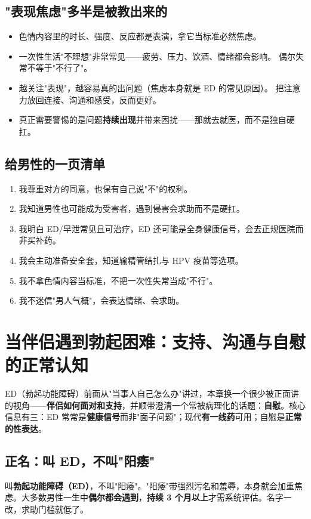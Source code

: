 \documentclass[12pt,UTF8,openany]{ctexbook}
\begin{document}
\section{"表现焦虑"多半是被教出来的}

\begin{itemize}[leftmargin=2em]
  \item 色情内容里的时长、强度、反应都是表演，拿它当标准必然焦虑。
  \item 一次性生活"不理想"非常常见——疲劳、压力、饮酒、情绪都会影响。
        偶尔失常不等于"不行了"。
  \item 越关注"表现"，越容易真的出问题（焦虑本身就是 ED 的常见原因）。
        把注意力放回连接、沟通和感受，反而更好。
  \item 真正需要警惕的是问题\textbf{持续出现}并带来困扰——那就去就医，而不是独自硬扛。
\end{itemize}

\section{给男性的一页清单}

\begin{enumerate}[leftmargin=2em,itemsep=0.3em]
  \item 我尊重对方的同意，也保有自己说"不"的权利。
  \item 我知道男性也可能成为受害者，遇到侵害会求助而不是硬扛。
  \item 我明白 ED/早泄常见且可治疗，ED 还可能是全身健康信号，会去正规医院而非买补药。
  \item 我会主动准备安全套，知道输精管结扎与 HPV 疫苗等选项。
  \item 我不拿色情内容当标准，不把一次性失常当成"不行"。
  \item 我不迷信"男人气概"，会表达情绪、会求助。
\end{enumerate}

\chapter{当伴侣遇到勃起困难：支持、沟通与自慰的正常认知}
\label{chap:partner-ed}

ED（勃起功能障碍）前面从"当事人自己怎么办"讲过，本章换一个很少被正面讲的视角——\textbf{伴侣如何面对和支持}，并顺带澄清一个常被病理化的话题：\textbf{自慰}。核心信息有三：ED 常常是\textbf{健康信号}而非"面子问题"；现代\textbf{有一线药}可用；自慰是\textbf{正常的性表达}。

\section{正名：叫 ED，不叫"阳痿"}
叫\textbf{勃起功能障碍（ED）}，不叫"阳痿"。"阳痿"带强烈污名和羞辱，本身就会加重焦虑。大多数男性一生中\textbf{偶尔都会遇到}，\textbf{持续 3 个月以上}才需系统评估。名字一改，求助门槛就低了。
\end{document}
